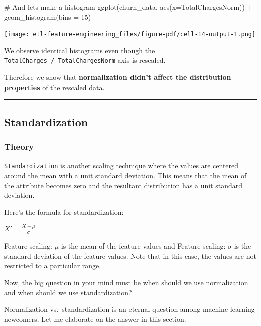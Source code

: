 \documentclass[
  letterpaper,
  DIV=11,
  numbers=noendperiod]{scrreprt}
\newenvironment{Shaded}{\begin{snugshade}}{\end{snugshade}}
\newcommand{\AttributeTok}[1]{\textcolor[rgb]{0.40,0.45,0.13}{#1}}
\newcommand{\CommentTok}[1]{\textcolor[rgb]{0.37,0.37,0.37}{#1}}
\newcommand{\DecValTok}[1]{\textcolor[rgb]{0.68,0.00,0.00}{#1}}
\newcommand{\FunctionTok}[1]{\textcolor[rgb]{0.28,0.35,0.67}{#1}}
\newcommand{\NormalTok}[1]{\textcolor[rgb]{0.00,0.23,0.31}{#1}}
\newcommand{\SpecialCharTok}[1]{\textcolor[rgb]{0.37,0.37,0.37}{#1}}
\begin{document}
\begin{Shaded}
\begin{Highlighting}[]
\CommentTok{\# And lets make a histogram}
\FunctionTok{ggplot}\NormalTok{(churn\_data, }\FunctionTok{aes}\NormalTok{(}\AttributeTok{x=}\NormalTok{TotalChargesNorm)) }\SpecialCharTok{+} \FunctionTok{geom\_histogram}\NormalTok{(}\AttributeTok{bins =} \DecValTok{15}\NormalTok{)}
\end{Highlighting}
\end{Shaded}

\texttt{[image: etl-feature-engineering\_files/figure-pdf/cell-14-output-1.png]}

We observe identical histograms even though the
\texttt{TotalCharges\ /\ TotalChargesNorm} axis is rescaled.

Therefore we show that \textbf{normalization didn't affect the
distribution properties} of the rescaled data.

\begin{center}\rule{0.5\linewidth}{0.5pt}\end{center}

\subsection{Standardization}\label{standardization}

\subsubsection{Theory}\label{theory-1}

\texttt{Standardization} is another scaling technique where the values
are centered around the mean with a unit standard deviation. This means
that the mean of the attribute becomes zero and the resultant
distribution has a unit standard deviation.

Here's the formula for standardization:

\(X' = \frac{X-\mu}{\sigma}\)

Feature scaling: \(\mu\) is the mean of the feature values and Feature
scaling: \(\sigma\) is the standard deviation of the feature values.
Note that in this case, the values are not restricted to a particular
range.

Now, the big question in your mind must be when should we use
normalization and when should we use standardization?

Normalization vs.~standardization is an eternal question among machine
learning newcomers. Let me elaborate on the answer in this section.
\end{document}
